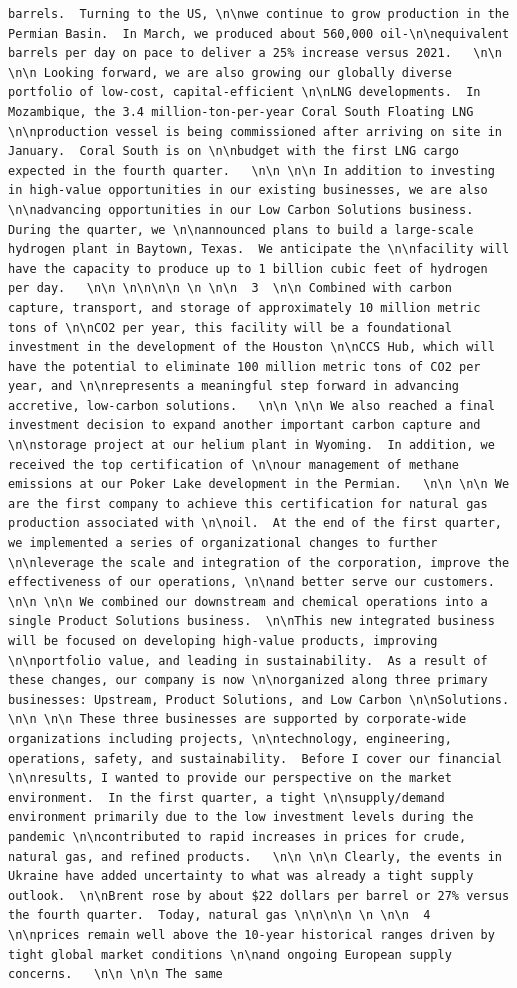 \documentclass[
  letterpaper,
  DIV=11,
  numbers=noendperiod]{scrreprt}
\begin{document}
\begin{verbatim}
barrels.  Turning to the US, \n\nwe continue to grow production in the Permian Basin.  In March, we produced about 560,000 oil-\n\nequivalent barrels per day on pace to deliver a 25% increase versus 2021.   \n\n \n\n Looking forward, we are also growing our globally diverse portfolio of low-cost, capital-efficient \n\nLNG developments.  In Mozambique, the 3.4 million-ton-per-year Coral South Floating LNG \n\nproduction vessel is being commissioned after arriving on site in January.  Coral South is on \n\nbudget with the first LNG cargo expected in the fourth quarter.   \n\n \n\n In addition to investing in high-value opportunities in our existing businesses, we are also \n\nadvancing opportunities in our Low Carbon Solutions business.  During the quarter, we \n\nannounced plans to build a large-scale hydrogen plant in Baytown, Texas.  We anticipate the \n\nfacility will have the capacity to produce up to 1 billion cubic feet of hydrogen per day.   \n\n \n\n\n\n \n \n\n  3  \n\n Combined with carbon capture, transport, and storage of approximately 10 million metric tons of \n\nCO2 per year, this facility will be a foundational investment in the development of the Houston \n\nCCS Hub, which will have the potential to eliminate 100 million metric tons of CO2 per year, and \n\nrepresents a meaningful step forward in advancing accretive, low-carbon solutions.   \n\n \n\n We also reached a final investment decision to expand another important carbon capture and \n\nstorage project at our helium plant in Wyoming.  In addition, we received the top certification of \n\nour management of methane emissions at our Poker Lake development in the Permian.   \n\n \n\n We are the first company to achieve this certification for natural gas production associated with \n\noil.  At the end of the first quarter, we implemented a series of organizational changes to further \n\nleverage the scale and integration of the corporation, improve the effectiveness of our operations, \n\nand better serve our customers.   \n\n \n\n We combined our downstream and chemical operations into a single Product Solutions business.  \n\nThis new integrated business will be focused on developing high-value products, improving \n\nportfolio value, and leading in sustainability.  As a result of these changes, our company is now \n\norganized along three primary businesses: Upstream, Product Solutions, and Low Carbon \n\nSolutions.   \n\n \n\n These three businesses are supported by corporate-wide organizations including projects, \n\ntechnology, engineering, operations, safety, and sustainability.  Before I cover our financial \n\nresults, I wanted to provide our perspective on the market environment.  In the first quarter, a tight \n\nsupply/demand environment primarily due to the low investment levels during the pandemic \n\ncontributed to rapid increases in prices for crude, natural gas, and refined products.   \n\n \n\n Clearly, the events in Ukraine have added uncertainty to what was already a tight supply outlook.  \n\nBrent rose by about $22 dollars per barrel or 27% versus the fourth quarter.  Today, natural gas \n\n\n\n \n \n\n  4  \n\nprices remain well above the 10-year historical ranges driven by tight global market conditions \n\nand ongoing European supply concerns.   \n\n \n\n The same 
\end{verbatim}
\end{document}
